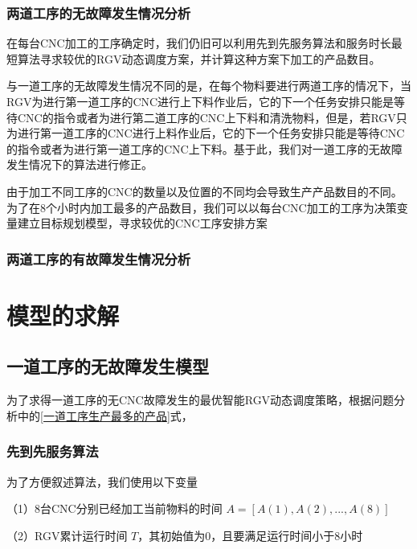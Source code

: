\documentclass[withoutpreface,bwprint]{cumcmthesis} %
\begin{document}
\subsubsection{两道工序的无故障发生情况分析}
在每台CNC加工的工序确定时，我们仍旧可以利用先到先服务算法和服务时长最短算法寻求较优的RGV动态调度方案，并计算这种方案下加工的产品数目。

与一道工序的无故障发生情况不同的是，在每个物料要进行两道工序的情况下，当RGV为进行第一道工序的CNC进行上下料作业后，它的下一个任务安排只能是等待CNC的指令或者为进行第二道工序的CNC上下料和清洗物料，但是，若RGV只为进行第一道工序的CNC进行上料作业后，它的下一个任务安排只能是等待CNC的指令或者为进行第一道工序的CNC上下料。基于此，我们对一道工序的无故障发生情况下的算法进行修正。

由于加工不同工序的CNC的数量以及位置的不同均会导致生产产品数目的不同。为了在8个小时内加工最多的产品数目，我们可以以每台CNC加工的工序为决策变量建立目标规划模型，寻求较优的CNC工序安排方案








\subsubsection{两道工序的有故障发生情况分析}












\section{模型的求解}
\subsection{一道工序的无故障发生模型}

为了求得一道工序的无CNC故障发生的最优智能RGV动态调度策略，根据问题分析中的\eqref{一道工序生产最多的产品}式，


\subsubsection{先到先服务算法} 
为了方便叙述算法，我们使用以下变量

（1）8台CNC分别已经加工当前物料的时间  $A = \left[ {A(1),A(2),...,A(8)} \right]$

（2）RGV累计运行时间  $T$，其初始值为0，且要满足运行时间小于8小时
\end{document}
